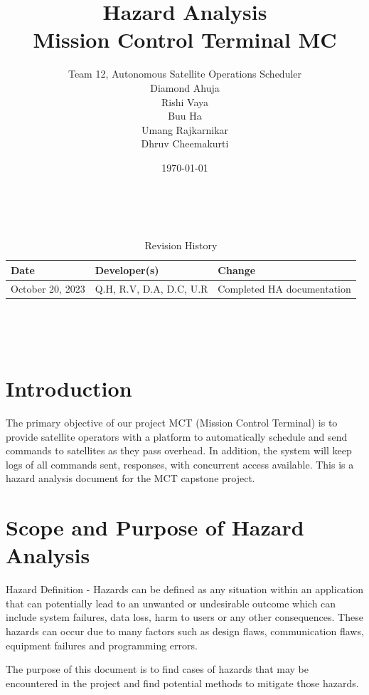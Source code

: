 \documentclass{article}
\title{Hazard Analysis \\\progname Mission Control Terminal MC}
\author{Team 12, Autonomous Satellite Operations Scheduler\\ Diamond Ahuja \\ Rishi Vaya \\ Buu Ha \\ Umang Rajkarnikar \\ Dhruv Cheemakurti}
\date{\today}
\begin{document}
\maketitle

~\newpage


\begin{table}[hp]
\caption{Revision History} \label{TblRevisionHistory}
\begin{tabularx}{\textwidth}{llX}
\toprule
\textbf{Date} & \textbf{Developer(s)} & \textbf{Change}\\
\midrule
October 20, 2023 & Q.H, R.V, D.A, D.C, U.R & Completed HA documentation\\
\bottomrule
\end{tabularx}
\end{table}

~\newpage

\tableofcontents

~\newpage



\section{Introduction}
The primary objective of our project MCT (Mission Control Terminal) is to provide satellite operators with a platform to automatically schedule and send commands to satellites as they pass overhead. In addition, the system will keep logs of all commands sent, responses, with concurrent access available. This is a hazard analysis document for the MCT capstone project.

\section{Scope and Purpose of Hazard Analysis}
Hazard Definition - Hazards can be defined as any situation within an application that can potentially lead to an unwanted or undesirable outcome which can include system failures, data loss, harm to users or any other consequences. These hazards can occur due to many factors such as design flaws, communication flaws, equipment failures and programming errors. 

The purpose of this document is to find cases of hazards that may be encountered in the project and find potential methods to mitigate those hazards.
\end{document}

